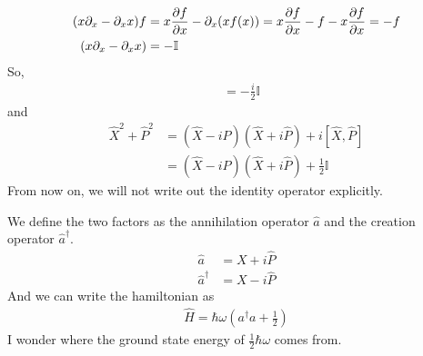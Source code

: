 \begin{align}
    (x\partial_x-\partial_xx)f&=x\partialderivative{f}{x}-\partial_x(xf(x))=x\partialderivative{f}{x}-f-x\partialderivative{f}{x}=-f\\
    (x\partial_x-\partial_xx)&=-\mathbb{I}
\end{align}
So,
\begin{align}
    [\hat X,\hat P]&=-\frac{i}{2}\mathbb{I}
\end{align}
and
\begin{align}
    \hat X^2+\hat P^2&=(\hat X-i\hat P)(\hat X+i\hat P)+i[\hat X,\hat P]\\
    &=(\hat X-i\hat P)(\hat X+i\hat P)+\frac{1}{2}\mathbb{I}
\end{align}
From now on, we will not write out the identity operator explicitly.

\noindent We define the two factors as the annihilation operator \(\hat a\) and the creation operator \(\hat a^\dagger\).
\begin{align}
    \hat a &= X+i\hat P\\
    \hat a^\dagger &= X-i\hat P
\end{align}
And we can write the hamiltonian as
\begin{align}
    \hat H=\hbar\omega\left(a^\dagger a+\frac{1}{2}\right)
\end{align}
I wonder where the ground state energy of \(\frac{1}{2}\hbar\omega\) comes from.
